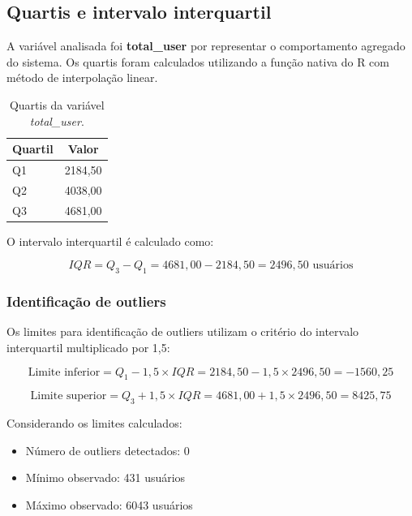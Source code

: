 \documentclass[12pt,a4paper]{article}
\begin{document}
\subsection{Quartis e intervalo interquartil}

A variável analisada foi \textbf{total\_user} por representar o comportamento agregado do sistema. Os quartis foram calculados utilizando a função nativa do R com método de interpolação linear.

\begin{table}[H]
    \centering
    \caption{Quartis da variável \textit{total\_user}.}
    \label{tab:quartis}
    \begin{tabular}{lc}
        \toprule
        \textbf{Quartil} & \textbf{Valor} \\
        \midrule
        Q1 & 2184,50 \\
        Q2 & 4038,00 \\
        Q3 & 4681,00 \\
        \bottomrule
    \end{tabular}
\end{table}

O intervalo interquartil é calculado como:

\begin{equation}
IQR = Q_3 - Q_1 = 4681,00 - 2184,50 = 2496,50 \text{ usuários}
\end{equation}

\subsubsection{Identificação de outliers}

Os limites para identificação de outliers utilizam o critério do intervalo interquartil multiplicado por 1,5:

\begin{equation}
\text{Limite inferior} = Q_1 - 1,5 \times IQR = 2184,50 - 1,5 \times 2496,50 = -1560,25
\end{equation}

\begin{equation}
\text{Limite superior} = Q_3 + 1,5 \times IQR = 4681,00 + 1,5 \times 2496,50 = 8425,75
\end{equation}

Considerando os limites calculados:

\begin{itemize}
    \item Número de outliers detectados: 0
    \item Mínimo observado: 431 usuários
    \item Máximo observado: 6043 usuários
\end{itemize}
\end{document}
